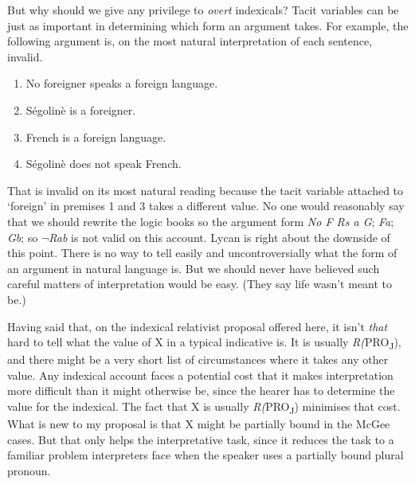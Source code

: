But why should we give any privilege to \textit{overt }indexicals? Tacit variables can be just as important in determining which form an argument takes. For example, the following argument is, on the most natural interpretation of each sentence, invalid.

\renewcommand{\labelenumi}{(\arabic{enumi})}
\begin{enumerate}
\setcounter{enumi}{0}
\item No foreigner speaks a foreign language.

\item S\'{e}golin\`{e} is a foreigner.

\item French is a foreign language.

\item S\'{e}golin\`{e} does not speak French.
\end{enumerate}

\noindent That is invalid on its most natural reading because the tacit variable attached to `foreign' in premises 1 and 3 takes a different value. No one would reasonably say that we should rewrite the logic books so the argument form \textit{No F Rs a G}; \textit{Fa}; \textit{Gb}; so \(\neg\){}\textit{Rab} is not valid on this account. Lycan is right about the downside of this point. There is no way to tell easily and uncontroversially what the form of an argument in natural language is. But we should never have believed such careful matters of interpretation would be easy. (They say life wasn't meant to be.)

Having said that, on the indexical relativist proposal offered here, it isn't \textit{that} hard to tell what the value of X in a typical indicative is. It is usually \textit{R(}PRO\textsubscript{J}), and there might be a very short list of circumstances where it takes any other value. Any indexical account faces a potential cost that it makes interpretation more difficult than it might otherwise be, since the hearer has to determine the value for the indexical. The fact that X is usually \textit{R(}PRO\textsubscript{J}) minimises that cost. What is new to my proposal is that X might be partially bound in the McGee cases. But that only helps the interpretative task, since it reduces the task to a familiar problem interpreters face when the speaker uses a partially bound plural pronoun.

